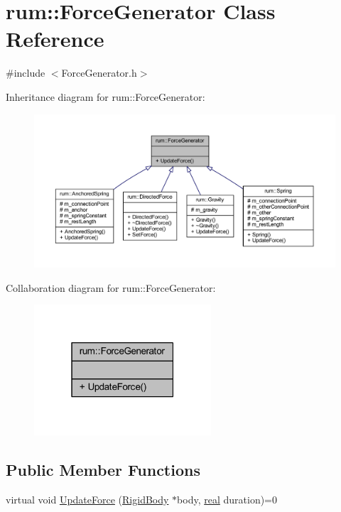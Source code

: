 \hypertarget{classrum_1_1_force_generator}{}\section{rum\+:\+:Force\+Generator Class Reference}
\label{classrum_1_1_force_generator}


{\ttfamily \#include $<$Force\+Generator.\+h$>$}



Inheritance diagram for rum\+:\+:Force\+Generator\+:\nopagebreak
\begin{figure}[H]
\begin{center}
\leavevmode
\includegraphics[width=350pt]{classrum_1_1_force_generator__inherit__graph}
\end{center}
\end{figure}


Collaboration diagram for rum\+:\+:Force\+Generator\+:\nopagebreak
\begin{figure}[H]
\begin{center}
\leavevmode
\includegraphics[width=187pt]{classrum_1_1_force_generator__coll__graph}
\end{center}
\end{figure}
\subsection*{Public Member Functions}
\begin{DoxyCompactItemize}
\item 
virtual void \hyperlink{classrum_1_1_force_generator_a6b038c9a39e4cf64b2dcf2741804a824}{Update\+Force} (\hyperlink{classrum_1_1_rigid_body}{Rigid\+Body} $\ast$body, \hyperlink{namespacerum_a7e8cca23573d5eaead0f138cbaa4862c}{real} duration)=0
\end{DoxyCompactItemize}


